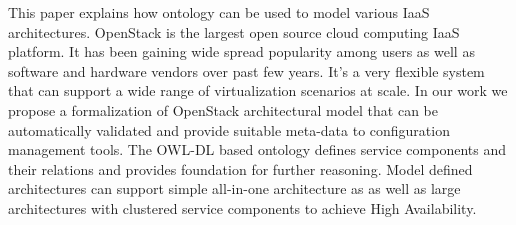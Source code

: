 
This paper explains how ontology can be used to model various IaaS architectures. OpenStack is the largest open source cloud computing IaaS platform. It has been gaining wide spread popularity among users as well as software and hardware vendors over past few years. It's a very flexible system that can support a wide range of virtualization scenarios at scale. In our work we propose a formalization of OpenStack architectural model that can be automatically validated and provide suitable meta-data to configuration management tools. The OWL-DL based ontology defines service components and their relations and  provides foundation for further reasoning. Model defined architectures can support simple all-in-one architecture as as well as large architectures with clustered service components to achieve High Availability.
